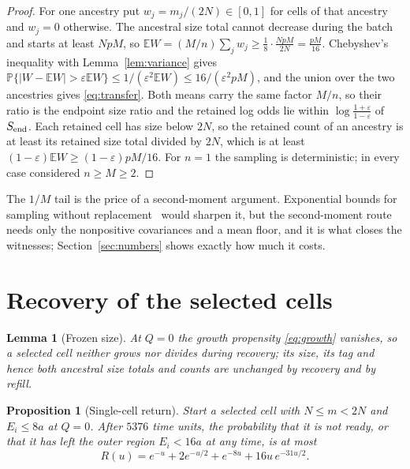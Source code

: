 \documentclass[11pt,a4paper]{article}
\theoremstyle{plain}
\newtheorem{proposition}[theorem]{Proposition}
\newtheorem{lemma}[theorem]{Lemma}
\theoremstyle{definition}
\theoremstyle{remark}
\newcommand{\Prob}{\mathbb P}
\newcommand{\E}{\mathbb E}
\newcommand{\eps}{\varepsilon}
\begin{document}
\begin{proof}
For one ancestry put $w_j=m_j/(2N)\in[0,1]$ for cells of that ancestry and $w_j=0$ otherwise. The ancestral size total cannot decrease during the batch and starts at least $NpM$, so $\E W=(M/n)\sum_jw_j\ge\frac18\cdot\frac{NpM}{2N}=\frac{pM}{16}$. Chebyshev's inequality with Lemma~\ref{lem:variance} gives $\Prob\{|W-\E W|>\eps\E W\}\le1/(\eps^2\E W)\le16/(\eps^2pM)$, and the union over the two ancestries gives \eqref{eq:transfer}. Both means carry the same factor $M/n$, so their ratio is the endpoint size ratio and the retained log odds lie within $\log\frac{1+\eps}{1-\eps}$ of $S_{\rm end}$. Each retained cell has size below $2N$, so the retained count of an ancestry is at least its retained size total divided by $2N$, which is at least $(1-\eps)\E W\ge(1-\eps)pM/16$. For $n=1$ the sampling is deterministic; in every case considered $n\ge M\ge2$.
\end{proof}

The $1/M$ tail is the price of a second-moment argument. Exponential bounds for sampling without replacement~\citep{hoeffding1963,bardenet2015} would sharpen it, but the second-moment route needs only the nonpositive covariances and a mean floor, and it is what closes the witnesses; Section~\ref{sec:numbers} shows exactly how much it costs.

\section{Recovery of the selected cells}\label{sec:recovery}

\begin{lemma}[Frozen size]\label{lem:frozen}
At $Q=0$ the growth propensity \eqref{eq:growth} vanishes, so a selected cell neither grows nor divides during recovery; its size, its tag and hence both ancestral size totals and counts are unchanged by recovery and by refill.
\end{lemma}

\begin{proposition}[Single-cell return]\label{prop:return}
Start a selected cell with $N\le m<2N$ and $E_i\le8a$ at $Q=0$. After $5376$ time units, the probability that it is not ready, or that it has left the outer region $E_i<16a$ at any time, is at most
\begin{equation}\label{eq:R}
R(u)=e^{-u}+2e^{-u/2}+e^{-8u}+16u\,e^{-31u/2}.
\end{equation}
\end{proposition}
\end{document}
